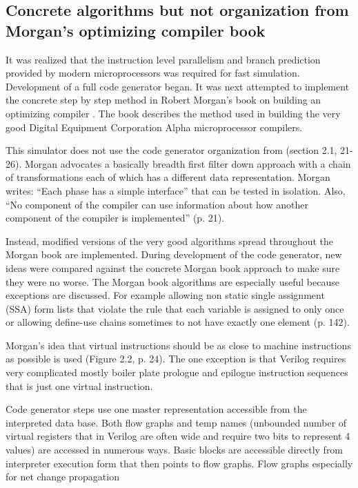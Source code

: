 \documentclass[preprint, authoryear]{sigplanconf}
\begin{document}
\subsection{Concrete algorithms but not organization from Morgan's optimizing compiler book}
\par
It was realized that the instruction level parallelism and branch prediction
provided by modern microprocessors was required for fast
simulation.
Development of a full code generator began.
It was next attempted to implement the concrete step by step method
in Robert Morgan's book on building an optimizing compiler \cite{Morgan1998}.
The book describes the method used in building the very good Digital
Equipment Corporation Alpha microprocessor compilers.
\par
This simulator does not use the code generator organization
from \cite{Morgan1998} (section 2.1, 21-26).
Morgan advocates a basically breadth
first filter down approach with a chain of transformations each of
which has a different data representation.  Morgan
writes: ``Each phase has a simple interface'' that can be tested in
isolation.  Also, ``No component of the compiler can use information
about how another component of the compiler is implemented'' (p. 21).
\par
Instead, modified versions of the very good algorithms
spread throughout the Morgan book are implemented.
During development of the code generator, new ideas were
compared against the concrete Morgan book approach to make sure they were no
worse.  The Morgan book algorithms are especially useful because
exceptions are discussed. For example allowing non static
single assignment (SSA) form lists that violate the
rule that each variable is assigned to only once or allowing 
define-use chains sometimes to not have exactly one element (p. 142).
\par
Morgan's idea that virtual instructions should be as
close to machine instructions as possible is used (Figure 2.2, p. 24).  The
one exception is that Verilog requires very complicated mostly
boiler plate prologue and epilogue instruction
sequences that is just one virtual instruction.
\par
Code generator steps use one master representation accessible from the
interpreted data base.  Both flow graphs and temp names
(unbounded number of virtual registers that in Verilog are often wide and
require two bits to represent 4 values) are accessed in numerous ways.
Basic blocks are accessible directly from interpreter execution form that then
points to flow graphs.  Flow graphs especially for net change propagation
\end{document}
